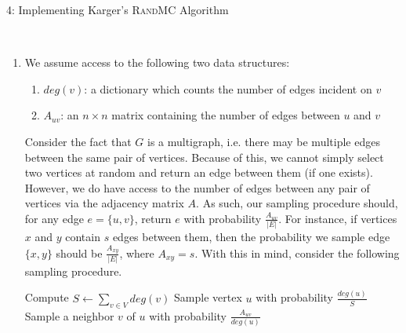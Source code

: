 \documentclass[12pt]{article}
\begin{document}
\begin{problem}{4: Implementing Karger's \textsc{RandMC} Algorithm}
\end{problem}
\begin{solution} \ \\
\begin{enumerate}[label=(\alph*)]
\item 
We assume access to the following two data structures:
\begin{enumerate}[label=(\alph*)]
    \item $deg(v)$: a dictionary which counts the number of edges incident on $v$
    \item $A_{uv}$: an $n \times n$ matrix containing the number of edges between $u$ and $v$
\end{enumerate}

Consider the fact that $G$ is a multigraph, i.e. there may be multiple edges between the same pair of vertices. Because of this, we cannot simply select two vertices at random and return an edge between them (if one exists). However, we do have access to the number of edges between any pair of vertices via the adjacency matrix $A$. As such, our sampling procedure should, for any edge $e = \{u, v\}$, return $e$ with probability $\frac{A_{uv}}{|E|}$. For instance, if vertices $x$ and $y$ contain $s$ edges between them, then the probability we sample edge $\{x, y\}$ should be $\frac{A_{xy}}{|E|}$, where $A_{xy} = s$. With this in mind, consider the following sampling procedure. 

\begin{answerbox}
\begin{algorithmic}[1]
\State Compute $S \gets \sum\limits_{v \in V} deg(v)$
\State Sample vertex $u$ with probability $\frac{deg(u)}{S}$
\State Sample a neighbor $v$ of $u$ with probability $\frac{A_{uv}}{deg(u)}$
\State {}
\EndProcedure
\end{algorithmic}
\end{answerbox}


\end{enumerate}
\end{solution}
\end{document}
